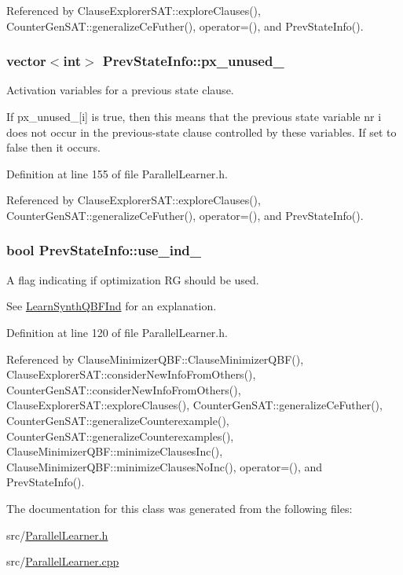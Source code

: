 Referenced by Clause\-Explorer\-S\-A\-T\-::explore\-Clauses(), Counter\-Gen\-S\-A\-T\-::generalize\-Ce\-Futher(), operator=(), and Prev\-State\-Info().

\hypertarget{classPrevStateInfo_a4e8557c4f0b12df62279daca0999b7bb}{
\subsubsection[{px\-\_\-unused\-\_\-}]{\setlength{\rightskip}{0pt plus 5cm}vector$<$int$>$ Prev\-State\-Info\-::px\-\_\-unused\-\_\-}}\label{classPrevStateInfo_a4e8557c4f0b12df62279daca0999b7bb}


Activation variables for a previous state clause. 

If px\-\_\-unused\-\_\-\mbox{[}i\mbox{]} is true, then this means that the previous state variable nr i does not occur in the previous-\/state clause controlled by these variables. If set to false then it occurs. 

Definition at line 155 of file Parallel\-Learner.\-h.



Referenced by Clause\-Explorer\-S\-A\-T\-::explore\-Clauses(), Counter\-Gen\-S\-A\-T\-::generalize\-Ce\-Futher(), operator=(), and Prev\-State\-Info().

\hypertarget{classPrevStateInfo_a87e1dd01468199a18b39ddc108bf4a70}{
\subsubsection[{use\-\_\-ind\-\_\-}]{\setlength{\rightskip}{0pt plus 5cm}bool Prev\-State\-Info\-::use\-\_\-ind\-\_\-}}\label{classPrevStateInfo_a87e1dd01468199a18b39ddc108bf4a70}


A flag indicating if optimization R\-G should be used. 

See \hyperlink{classLearnSynthQBFInd}{Learn\-Synth\-Q\-B\-F\-Ind} for an explanation. 

Definition at line 120 of file Parallel\-Learner.\-h.



Referenced by Clause\-Minimizer\-Q\-B\-F\-::\-Clause\-Minimizer\-Q\-B\-F(), Clause\-Explorer\-S\-A\-T\-::consider\-New\-Info\-From\-Others(), Counter\-Gen\-S\-A\-T\-::consider\-New\-Info\-From\-Others(), Clause\-Explorer\-S\-A\-T\-::explore\-Clauses(), Counter\-Gen\-S\-A\-T\-::generalize\-Ce\-Futher(), Counter\-Gen\-S\-A\-T\-::generalize\-Counterexample(), Counter\-Gen\-S\-A\-T\-::generalize\-Counterexamples(), Clause\-Minimizer\-Q\-B\-F\-::minimize\-Clauses\-Inc(), Clause\-Minimizer\-Q\-B\-F\-::minimize\-Clauses\-No\-Inc(), operator=(), and Prev\-State\-Info().



The documentation for this class was generated from the following files\-:\begin{DoxyCompactItemize}
\item 
src/\hyperlink{ParallelLearner_8h}{Parallel\-Learner.\-h}\item 
src/\hyperlink{ParallelLearner_8cpp}{Parallel\-Learner.\-cpp}\end{DoxyCompactItemize}

